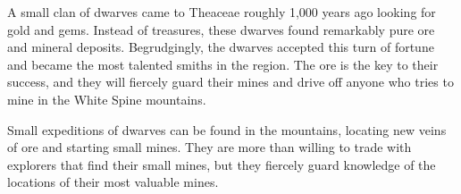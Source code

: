 A small clan of dwarves came to Theaceae roughly 1,000 years ago looking for gold and gems.
Instead of treasures, these dwarves found remarkably pure ore and mineral deposits.
Begrudgingly, the dwarves accepted this turn of fortune and became the most talented smiths in the region.
The ore is the key to their success, and they will fiercely guard their mines and drive off anyone who tries to mine in the White Spine mountains.

Small expeditions of dwarves can be found in the mountains, locating new veins of ore and starting small mines.
They are more than willing to trade with explorers that find their small mines, but they fiercely guard knowledge of the locations of their most valuable mines.
